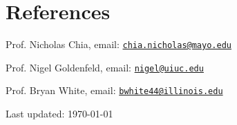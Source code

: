 \documentclass[letterpaper]{article}
\def\footerlink{http://guava.physics.uiuc.edu/~patricio/CV.html}
\renewenvironment{itemize}{
  \begin{list}{}{
    \setlength{\leftmargin}{1.5em}
  }
}{
  \end{list}
}
\begin{document}

\section*{References}
\begin{itemize}
  \item Prof. Nicholas Chia, email:
  \href{mailto:chia.nicholas@mayo.edu}{\texttt{chia.nicholas@mayo.edu}}
  \item Prof. Nigel Goldenfeld, email:
  \href{mailto:nigel@uiuc.edu}{\texttt {nigel@uiuc.edu}}
  \item Prof. Bryan White, email:
  \href{mailto:bwhite44@illinois.edu}{\texttt{bwhite44@illinois.edu}}
\end{itemize}
 \bigskip

 \begin{center}
   \begin{footnotesize}
     Last updated: \today \\
   \end{footnotesize}
 \end{center}
\end{document}
